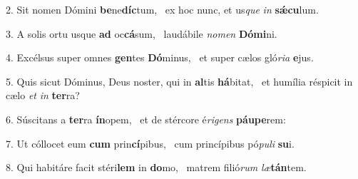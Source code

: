 2. Sit nomen Dómini \textbf{be}ne\textbf{díc}tum, \ast\  ex hoc nunc, et us\textit{que} \textit{in} \textbf{sǽ}\textbf{cu}lum.\

3. A solis ortu usque \textbf{ad} oc\textbf{cá}sum, \ast\  laudábile \textit{no}\textit{men} \textbf{Dó}\textbf{mi}ni.\

4. Excélsus super omnes \textbf{gen}tes \textbf{Dó}minus, \ast\  et super cælos gló\textit{ri}\textit{a} \textbf{e}jus.\

5. Quis sicut Dóminus, Deus noster, qui in \textbf{al}tis \textbf{há}bitat, \ast\  et humília réspicit in cælo \textit{et} \textit{in} \textbf{ter}ra?\

6. Súscitans a \textbf{ter}ra \textbf{ín}opem, \ast\  et de stércore é\textit{ri}\textit{gens} \textbf{páu}\textbf{pe}rem:\

7. Ut cóllocet eum \textbf{cum} prin\textbf{cí}pibus, \ast\  cum princípibus pó\textit{pu}\textit{li} \textbf{su}i.\

8. Qui habitáre facit stéri\textbf{lem} in \textbf{do}mo, \ast\  matrem filió\textit{rum} \textit{læ}\textbf{tán}tem.\

